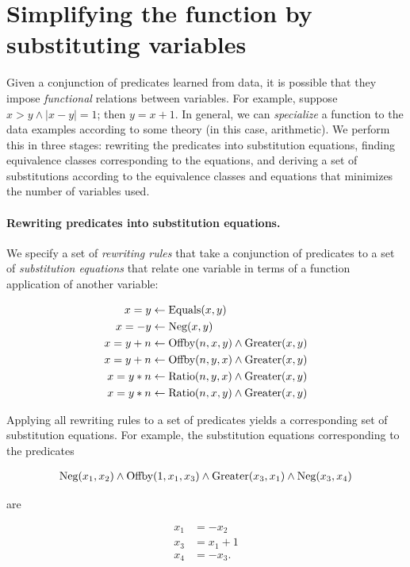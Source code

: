 \documentclass{acmsiggraph}
\begin{document}
\section{Simplifying the function by substituting variables}

Given a conjunction of predicates learned from data,
it is possible that they impose \emph{functional} relations between variables.
For example, suppose $x > y \wedge |x - y| = 1$; then $y = x + 1$.
In general, we can \emph{specialize} a function
to the data examples according to some theory (in this case, arithmetic).
We perform this in three stages: 
rewriting the predicates into substitution equations,
finding equivalence classes corresponding to the equations,
and deriving a set of substitutions according to the equivalence classes and equations
that minimizes the number of variables used.

\paragraph{Rewriting predicates into substitution equations.}
We specify a set of \emph{rewriting rules}
that take a conjunction of predicates to a set of \emph{substitution equations}
that relate one variable in terms of a function application of another variable:


\begin{align*}
x = y &\leftarrow \textup{Equals}(x, y) \\
x = -y &\leftarrow \textup{Neg}(x, y) \\
x = y + n &\leftarrow \textup{Offby}(n, x, y) \wedge \textup{Greater}(x, y) \\
x = y + n &\leftarrow \textup{Offby}(n, y, x) \wedge \textup{Greater}(x, y) \\
x = y * n &\leftarrow \textup{Ratio}(n, y, x) \wedge \textup{Greater}(x, y) \\
x = y * n &\leftarrow \textup{Ratio}(n, x, y) \wedge \textup{Greater}(x, y)
\end{align*}

Applying all rewriting rules to a set of predicates
yields a corresponding set of substitution equations.
For example, the substitution equations corresponding to the predicates

\begin{align*}
\textup{Neg}(x_1, x_2) \wedge \textup{Offby}(1, x_1, x_3) \wedge \textup{Greater}(x_3, x_1) \wedge \textup{Neg}(x_3, x_4)
\end{align*}

are

\begin{align*}
x_1 &= -x_2 \\
x_3 &= x_1 + 1 \\
x_4 &= -x_3.
\end{align*}
\end{document}
